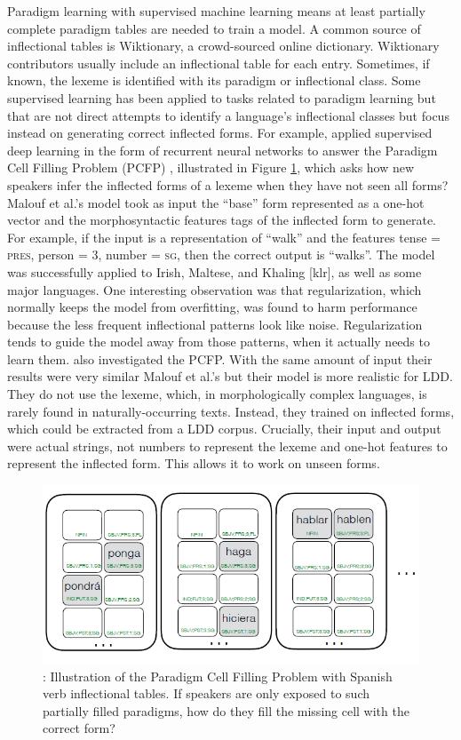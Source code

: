\documentclass[12pt]{article}
\begin{document}
Paradigm learning with supervised machine learning means at least partially complete paradigm tables are needed to train a model. A common source of inflectional tables is Wiktionary, a crowd-sourced online dictionary. Wiktionary contributors usually include an inflectional table for each entry. Sometimes, if known, the lexeme is identified with its paradigm or inflectional class. Some supervised learning has been applied to tasks related to paradigm learning but that are not direct attempts to identify a language's inflectional classes but focus instead on generating correct inflected forms. For example,  applied supervised deep learning in the form of recurrent neural networks to answer the Paradigm Cell Filling Problem (PCFP) \cite{Ackerman_partsand}, illustrated in Figure \ref{fig:PCFP}, which asks how new speakers infer the inflected forms of a lexeme when they have not seen all forms? Malouf et al.'s model took as input the ``base'' form represented as a one-hot vector and the morphosyntactic features tags of the inflected form to generate. For example, if the input is a representation of ``walk'' and the features tense = \textsc{pres}, person = \textsc{3}, number = \textsc{sg}, then the correct output is ``walks''. The model was successfully applied to Irish, Maltese, and Khaling [klr], as well as some major languages. One interesting observation was that regularization, which normally keeps the model from overfitting, was found to harm performance because the less frequent inflectional patterns look like noise. Regularization tends to guide the model away from those patterns, when it actually needs to learn them.  also investigated the PCFP. With the same amount of input their results were very similar Malouf et al.'s but their model is more realistic for LDD. They do not use the lexeme, which, in morphologically complex languages, is rarely found in naturally-occurring texts. Instead, they trained on inflected forms, which could be extracted from a LDD corpus. Crucially, their input and output were actual strings, not numbers to represent the lexeme and one-hot features to represent the inflected form. This allows it to work on unseen forms. 
\begin{figure}[ht]
\label{fig:PCFP}
\begin{center}
\includegraphics[width=0.7\columnwidth]{PCFP.PNG}
\caption{: Illustration of the Paradigm Cell Filling Problem with Spanish verb inflectional tables. If speakers are only exposed to such partially filled paradigms, how do they fill the missing cell with the correct form?}
\end{center}
\end{figure}
\end{document}
